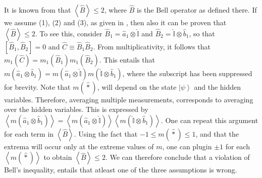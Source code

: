 It is known from  that $\left\langle \hat{B}\right\rangle \le2$,
where $\hat{B}$ is the Bell operator as defined there. If we assume
(1), (2) and (3), as given in ,
then also it can be proven that $\left\langle \hat{B}\right\rangle \le2$.
To see this, consider $\hat{B}_{1}=\hat{a}_{1}\otimes\hat{\mathbb{I}}$
and $\hat{B}_{2}=\hat{\mathbb{I}}\otimes\hat{b}_{1}$, so that $[\hat{B}_{1},\hat{B}_{2}]=0$
and $\hat{C}\equiv\hat{B}_{1}\hat{B}_{2}$. From multiplicativity,
it follows that $m_{1}(\hat{C})=m_{1}(\hat{B}_{1})m_{1}(\hat{B}_{2})$.
This entails that $m(\hat{a}_{1}\otimes\hat{b}_{1})=m(\hat{a}_{1}\otimes\hat{\mathbb{I}})m(\hat{\mathbb{I}}\otimes\hat{b}_{1})$,
where the subscript has been suppressed for brevity. Note that $m(\hat{*})$,
will depend on the state $\left|\psi\right\rangle $ and the hidden
variables. Therefore, averaging multiple measurements, corresponds
to averaging over the hidden variables. This is expressed by $\left\langle m(\hat{a}_{1}\otimes\hat{b}_{1})\right\rangle =\left\langle m(\hat{a}_{1}\otimes\hat{\mathbb{I}})\right\rangle \left\langle m(\hat{\mathbb{I}}\otimes\hat{b}_{1})\right\rangle $.
One can repeat this argument for each term in $\left\langle \hat{B}\right\rangle $.
Using the fact that $-1\le m(\hat{*})\le1$, and that the extrema
will occur only at the extreme values of $m$, one can plugin $\pm1$
for each $\left\langle m(\hat{*})\right\rangle $ to obtain $\left\langle \hat{B}\right\rangle \le2$.
We can therefore conclude that a violation of Bell's inequality, entails
that atleast one of the three assumptions is wrong. 

